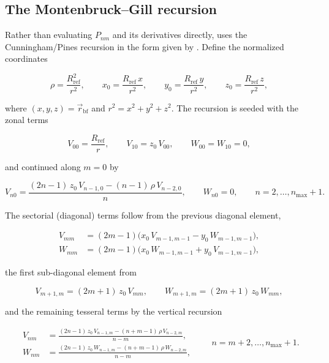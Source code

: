 \subsection{The Montenbruck--Gill recursion}

Rather than evaluating $P_{nm}$ and its derivatives directly, \lupnt{} uses the
Cunningham/Pines recursion in the form given by \citet{montenbruck2000}. Define
the normalized coordinates

\begin{equation}
  \label{eq:dyn-vw-coords}
  \rho = \frac{R_\mathrm{ref}^2}{r^2},
  \qquad
  x_0 = \frac{R_\mathrm{ref}\,x}{r^2},
  \qquad
  y_0 = \frac{R_\mathrm{ref}\,y}{r^2},
  \qquad
  z_0 = \frac{R_\mathrm{ref}\,z}{r^2},
\end{equation}

where $(x,y,z)=\vec{r}_\mathrm{bf}$ and $r^2 = x^2+y^2+z^2$. The recursion is
seeded with the zonal terms

\begin{equation}
  \label{eq:dyn-vw-seed}
  V_{00} = \frac{R_\mathrm{ref}}{r}, \qquad
  V_{10} = z_0\,V_{00}, \qquad
  W_{00} = W_{10} = 0,
\end{equation}

and continued along $m=0$ by

\begin{equation}
  \label{eq:dyn-vw-zonal}
  V_{n0} = \frac{(2n-1)\,z_0\,V_{n-1,0} - (n-1)\,\rho\,V_{n-2,0}}{n},
  \qquad W_{n0}=0,
  \qquad n = 2,\dots,n_\mathrm{max}+1 .
\end{equation}

The sectorial (diagonal) terms follow from the previous diagonal element,

\begin{align}
  V_{mm} &= (2m-1)\bigl(x_0\,V_{m-1,m-1} - y_0\,W_{m-1,m-1}\bigr), \label{eq:dyn-vw-sect-v}\\
  W_{mm} &= (2m-1)\bigl(x_0\,W_{m-1,m-1} + y_0\,V_{m-1,m-1}\bigr), \label{eq:dyn-vw-sect-w}
\end{align}

the first sub-diagonal element from

\begin{equation}
  \label{eq:dyn-vw-sub}
  V_{m+1,m} = (2m+1)\,z_0\,V_{mm},
  \qquad
  W_{m+1,m} = (2m+1)\,z_0\,W_{mm},
\end{equation}

and the remaining tesseral terms by the vertical recursion

\begin{equation}
  \label{eq:dyn-vw-tess}
  \begin{aligned}
    V_{nm} &= \frac{(2n-1)\,z_0\,V_{n-1,m} - (n+m-1)\,\rho\,V_{n-2,m}}{n-m}, \\
    W_{nm} &= \frac{(2n-1)\,z_0\,W_{n-1,m} - (n+m-1)\,\rho\,W_{n-2,m}}{n-m},
  \end{aligned}
  \qquad n = m+2,\dots,n_\mathrm{max}+1 .
\end{equation}

